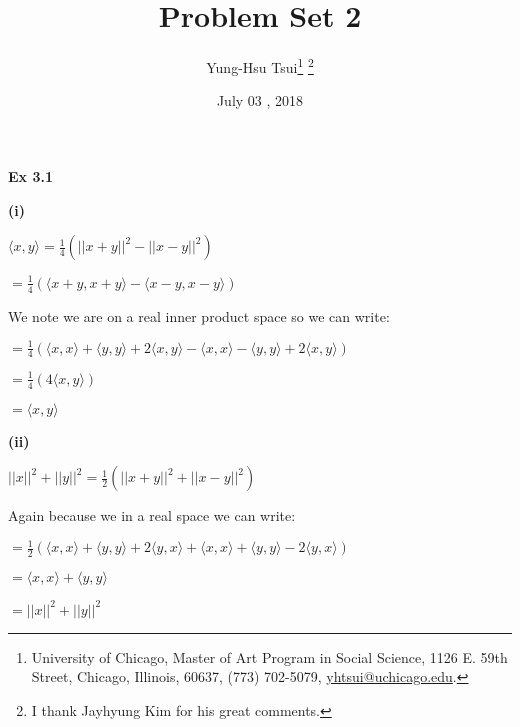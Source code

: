 \documentclass[letterpaper,12pt]{article}
\theoremstyle{definition}
\begin{document}
	
	\title{Problem Set 2\\
	}
	\author{
		Yung-Hsu Tsui\footnote{University of Chicago, Master of Art Program in Social Science, 1126 E. 59th Street, Chicago, Illinois, 60637, (773) 702-5079, \href{mailto:}{yhtsui@uchicago.edu}.} \footnote{I thank Jayhyung Kim for his great comments.}\\[-2pt]
	}
	\date{July 03 ,  2018 }
	\vspace{-9mm}
	\maketitle
	\thispagestyle{empty}
	
	\pagestyle{fancy}
	\fancyhf{}
	\cfoot{\thepage}
	
	\begin{spacing}{1.3}{}
		\vspace{1 mm}

	
	\textbf{Ex 3.1}
	
	\setlength{\leftskip}{10pt}
	
	\textbf{(i)}
	
	\setlength{\leftskip}{20pt}
	$\langle x, y \rangle = \frac{1}{4}(||x + y||^2 - ||x - y||^2)$
	
	$= \frac{1}{4}(\langle x + y, x + y \rangle - \langle x - y, x - y \rangle)$
	
	We note we are on a real inner product space so we can write:
	
	$= \frac{1}{4}(\langle x, x \rangle + \langle y, y \rangle + 2\langle x, y \rangle - \langle x, x \rangle - \langle y, y \rangle + 2\langle x, y \rangle)$
	
	$= \frac{1}{4}(4\langle x, y \rangle)$
	
	$= \langle x, y \rangle$
	
	\setlength{\leftskip}{10pt}
	
	\textbf{(ii)}
	
	\setlength{\leftskip}{20pt}
	
	$||x||^2 + ||y||^2 = \frac{1}{2}(||x + y||^2 + ||x - y||^2)$
	
	Again because we in a real space we can write:
	
	$= \frac{1}{2}(\langle x, x \rangle + \langle y, y \rangle + 2\langle y, x \rangle + \langle x, x \rangle + \langle y, y \rangle - 2\langle y, x \rangle)$
	
	$= \langle x, x \rangle + \langle y, y \rangle$
	
	$= ||x||^2 + ||y||^2$
	

\end{spacing}
\end{document}
